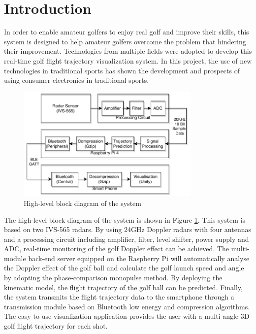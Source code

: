 \thispagestyle{empty}
\newpage

\tableofcontents{\protect\thispagestyle{empty}}
\pagestyle{fancy}
\clearpage
\setcounter{page}{1}
\newpage



\section{Introduction}
In order to enable amateur golfers to enjoy real golf and improve their skills, this system is designed to help amateur golfers overcome the problem that hindering their improvement.
Technologies from multiple fields were adopted to develop this real-time golf flight trajectory visualization system. In this project, the use of new technologies in traditional sports has shown the development and prospects of using consumer electronics in traditional sports.

\begin{figure}[H]
    \centering
    \includegraphics[width=0.8\textwidth]{figure/BlockDiagram_bw.pdf}
    \caption{High-level block diagram of the system}
     \label{fig:block}
\end{figure}

The high-level block diagram of the system is shown in Figure \ref{fig:block}. This system is based on two IVS-565 radars. By using 24GHz Doppler radars with four antennas and a processing circuit including amplifier, filter, level shifter, power supply and ADC, real-time monitoring of the golf Doppler effect can be achieved. The multi-module back-end server equipped on the Raspberry Pi will automatically analyse the Doppler effect of the golf ball and calculate the golf launch speed and angle by adopting the phase-comparison monopulse method.
By deploying the kinematic model, the flight trajectory of the golf ball can be predicted. Finally, the system transmits the flight trajectory data to the smartphone through a transmission module based on Bluetooth low energy and compression algorithms. The easy-to-use visualization application provides the user with a multi-angle 3D golf flight trajectory for each shot.


